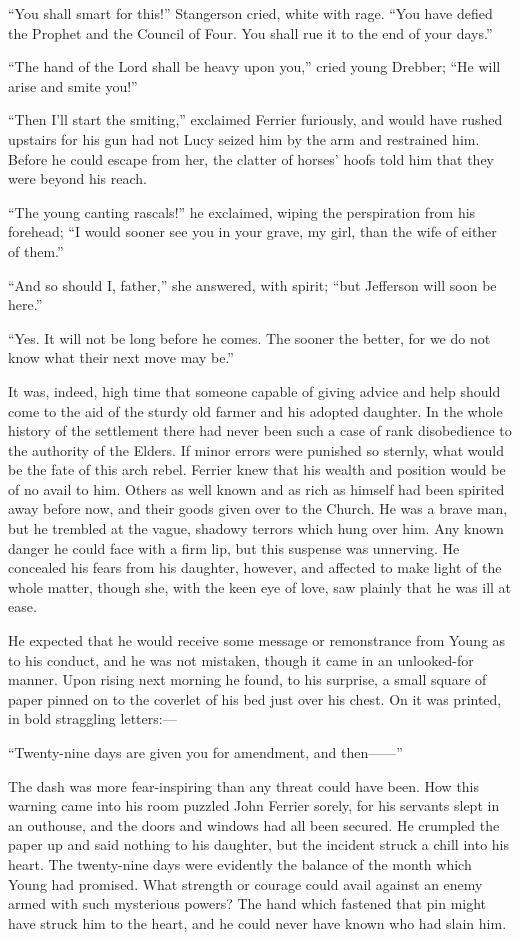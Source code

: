\documentclass[12pt]{book}
\begin{document}
“You shall smart for this!” Stangerson cried, white with rage. “You have defied the Prophet and the Council of Four. You shall rue it to the end of your days.” 

“The hand of the Lord shall be heavy upon you,” cried young Drebber; “He will arise and smite you!” 

“Then I’ll start the smiting,” exclaimed Ferrier furiously, and would have rushed upstairs for his gun had not Lucy seized him by the arm and restrained him. Before he could escape from her, the clatter of horses’ hoofs told him that they were beyond his reach. 

“The young canting rascals!” he exclaimed, wiping the perspiration from his forehead; “I would sooner see you in your grave, my girl, than the wife of either of them.” 

“And so should I, father,” she answered, with spirit; “but Jefferson will soon be here.” 

“Yes. It will not be long before he comes. The sooner the better, for we do not know what their next move may be.” 

It was, indeed, high time that someone capable of giving advice and help should come to the aid of the sturdy old farmer and his adopted daughter. In the whole history of the settlement there had never been such a case of rank disobedience to the authority of the Elders. If minor errors were punished so sternly, what would be the fate of this arch rebel. Ferrier knew that his wealth and position would be of no avail to him. Others as well known and as rich as himself had been spirited away before now, and their goods given over to the Church. He was a brave man, but he trembled at the vague, shadowy terrors which hung over him. Any known danger he could face with a firm lip, but this suspense was unnerving. He concealed his fears from his daughter, however, and affected to make light of the whole matter, though she, with the keen eye of love, saw plainly that he was ill at ease. 

He expected that he would receive some message or remonstrance from Young as to his conduct, and he was not mistaken, though it came in an unlooked-for manner. Upon rising next morning he found, to his surprise, a small square of paper pinned on to the coverlet of his bed just over his chest. On it was printed, in bold straggling letters:— 

“Twenty-nine days are given you for amendment, and then——” 

The dash was more fear-inspiring than any threat could have been. How this warning came into his room puzzled John Ferrier sorely, for his servants slept in an outhouse, and the doors and windows had all been secured. He crumpled the paper up and said nothing to his daughter, but the incident struck a chill into his heart. The twenty-nine days were evidently the balance of the month which Young had promised. What strength or courage could avail against an enemy armed with such mysterious powers? The hand which fastened that pin might have struck him to the heart, and he could never have known who had slain him. 
\end{document}
